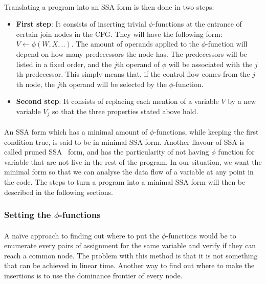 \paragraph{}
Translating a program into an SSA form is then done in two steps: 
\begin{itemize}
	\item \textbf{First step}: It consists of inserting trivial $\phi$-functions at the entrance of certain join nodes in the CFG. They will have the following form: $V \leftarrow \phi(W, X, ..)$. The amount of operands applied to the $\phi$-function will depend on how many predecessors the node has. The predecessors will be listed in a fixed order, and the $j$th operand of $\phi$ will be associated with the $j$th predecessor. This simply means that, if the control flow comes from the $j$th node, the $j$th operand will be selected by the $\phi$-function.
	\item \textbf{Second step}: It consists of replacing each mention of a variable $V$ by a new variable $V_j$ so that the three properties stated above hold.
\end{itemize}

\paragraph{}
An SSA form which has a minimal amount of $\phi$-functions, while keeping the first condition true, is said to be in minimal SSA form. Another flavour of SSA is called pruned SSA~\cite{choi1991automatic} form, and has the particularity of not having $\phi$ function for variable that are not live in the rest of the program. In our situation, we want the minimal form so that we can analyse the data flow of a variable at any point in the code. The steps to turn a program into a minimal SSA form will then be described in the following sections.

\subsubsection{Setting the $\phi$-functions}
\paragraph{}
A naïve approach to finding out where to put the $\phi$-functions would be to enumerate every pairs of assignment for the same variable and verify if they can reach a common node. The problem with this method is that it is not something that can be achieved in linear time. Another way to find out where to make the insertions is to use the dominance frontier of every node.

